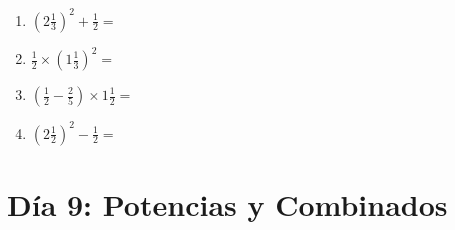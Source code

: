 \documentclass[12pt]{article}
\begin{document}
\begin{enumerate}
\item \large $ \left( 2 \frac{1}{3} \right)^2 + \frac{1}{2} = $ \vspace{1.6cm}
\item \large $ \frac{1}{2} \times \left( 1 \frac{1}{3} \right)^2 = $ \vspace{1.6cm}
\item \large $ \left( \frac{1}{2} - \frac{2}{5} \right) \times 1 \frac{1}{2} = $ \vspace{1.6cm}
\item \large $ \left( 2 \frac{1}{2} \right)^2 - \frac{1}{2} = $ \vspace{1.6cm}
\end{enumerate}\newpage
\section*{Día 9: Potencias y Combinados}
\end{document}
